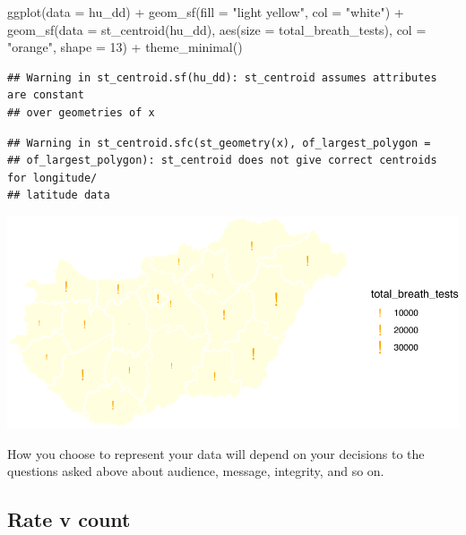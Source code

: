 \documentclass[
]{book}
\newenvironment{Shaded}{\begin{snugshade}}{\end{snugshade}}
\newcommand{\AttributeTok}[1]{\textcolor[rgb]{0.77,0.63,0.00}{#1}}
\newcommand{\DecValTok}[1]{\textcolor[rgb]{0.00,0.00,0.81}{#1}}
\newcommand{\FunctionTok}[1]{\textcolor[rgb]{0.00,0.00,0.00}{#1}}
\newcommand{\NormalTok}[1]{#1}
\newcommand{\SpecialCharTok}[1]{\textcolor[rgb]{0.00,0.00,0.00}{#1}}
\newcommand{\StringTok}[1]{\textcolor[rgb]{0.31,0.60,0.02}{#1}}
\begin{document}
\begin{Shaded}
\begin{Highlighting}[]
\FunctionTok{ggplot}\NormalTok{(}\AttributeTok{data =}\NormalTok{ hu\_dd) }\SpecialCharTok{+} 
  \FunctionTok{geom\_sf}\NormalTok{(}\AttributeTok{fill =} \StringTok{"light yellow"}\NormalTok{, }\AttributeTok{col =} \StringTok{"white"}\NormalTok{) }\SpecialCharTok{+} 
  \FunctionTok{geom\_sf}\NormalTok{(}\AttributeTok{data =} \FunctionTok{st\_centroid}\NormalTok{(hu\_dd), }\FunctionTok{aes}\NormalTok{(}\AttributeTok{size =}\NormalTok{ total\_breath\_tests), }\AttributeTok{col =} \StringTok{"orange"}\NormalTok{, }\AttributeTok{shape =} \DecValTok{13}\NormalTok{) }\SpecialCharTok{+} 
  \FunctionTok{theme\_minimal}\NormalTok{()}
\end{Highlighting}
\end{Shaded}

\begin{verbatim}
## Warning in st_centroid.sf(hu_dd): st_centroid assumes attributes are constant
## over geometries of x
\end{verbatim}

\begin{verbatim}
## Warning in st_centroid.sfc(st_geometry(x), of_largest_polygon =
## of_largest_polygon): st_centroid does not give correct centroids for longitude/
## latitude data
\end{verbatim}

\includegraphics{crime_mapping_files/figure-latex/gradsymbmapcoldiamond-1.pdf}

How you choose to represent your data will depend on your decisions to the questions asked above about audience, message, integrity, and so on.

\hypertarget{rate-v-count}{%
\subsection{Rate v count}\label{rate-v-count}}
\end{document}
